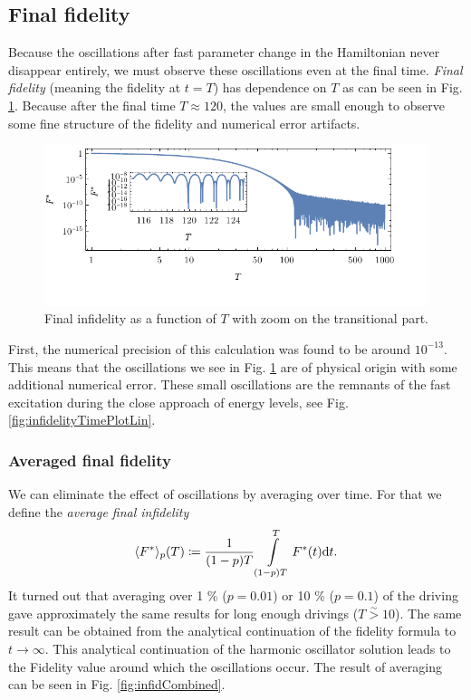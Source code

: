 \subsection{Final fidelity}
Because the oscillations after fast parameter change in the Hamiltonian never disappear entirely, we must observe these oscillations even at the final time. \emph{Final fidelity} (meaning the fidelity at $t=T$) has dependence on $T$ as can be seen in Fig. \ref{fig:infidelityTfPlotLogLinCombined}. Because after the final time $T\approx 120$, the values are small enough to observe some fine structure of the fidelity and numerical error artifacts.
\begin{figure}[H]
    \centering
    \includegraphics[scale=1.2]{../img/infidelityTfPlotLogLinCombined1.pdf}
    \caption{Final infidelity as a function of $T$ with zoom on the transitional part.}
    \label{fig:infidelityTfPlotLogLinCombined}
\end{figure}

First, the numerical precision of this calculation was found to be around $10^{-13}$. This means that the oscillations we see in Fig. \ref{fig:infidelityTfPlotLogLinCombined} are of physical origin with some additional numerical error. These small oscillations are the remnants of the fast excitation during the close approach of energy levels, see Fig. \ref{fig:infidelityTimePlotLin}. 



\subsubsection{Averaged final fidelity}
We can eliminate the effect of oscillations by averaging over time. For that we define the \emph{average final infidelity}
\begin{equation}
    \langle F^*\rangle_p(T) \coloneqq \frac{1}{(1-p) T}\int\limits_{(1-p) T}^{T} F^*(t)\mathrm{d} t.
\end{equation}
It turned out that averaging over 1 \% ($p=0.01$) or 10 \% ($p=0.1$) of the driving gave approximately the same results for long enough drivings ($T\overset{\sim}{>} 10$). The same result can be obtained from the analytical continuation of the fidelity formula to $t\rightarrow  \infty$. This analytical continuation of the harmonic oscillator solution leads to the Fidelity value around which the oscillations occur. The result of averaging can be seen in Fig. \ref{fig:infidCombined}.

